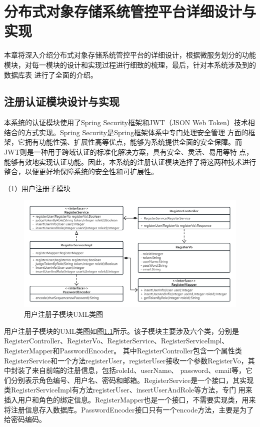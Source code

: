 \chapter{分布式对象存储系统管控平台详细设计与实现}

本章将深入介绍分布式对象存储系统管控平台的详细设计，根据微服务划分的功能模块，对每一模块的设计和实现过程进行细致的梳理，最后，针对本系统涉及到的数据库表
进行了全面的介绍。

\section{注册认证模块设计与实现}

本系统的认证模块使用了Spring Security框架和JWT（JSON Web Token）技术相结合的方式实现\cite{k256eji}。Spring Security是Spring框架体系中专门处理安全管理
方面的框架，它拥有功能性强、扩展性高等优点，能够为系统提供全面的安全保障。而JWT则是一种用于跨域认证的标准化解决方案，具有安全、灵活、易用等特
点，能够有效地实现认证功能。因此，本系统的注册认证模块选择了将这两种技术进行整合，以便更好地保障系统的安全性和可扩展性。

（1）用户注册子模块

\begin{figure}[htb]
    \centering
    \includegraphics[width=1\textwidth]{my_figures/chapter5/用户注册子模块UML类图.png}
    \caption{用户注册子模块UML类图}
    \label{fig:用户注册子模块UML类图}
\end{figure}

用户注册子模块的UML类图如图\ref{fig:用户注册子模块UML类图}所示。该子模块主要涉及六个类，分别是RegisterController、RegisterVo、RegisterService、RegisterServiceImpl、RegisterMapper和PasswordEncoder。
其中RegisterController包含一个属性类RegisterService和一个方法registerUser，registerUser接收一个参数RegisterVo，其中封装了来自前端的注册信息，包括roleId、userName、
password、email等，它们分别表示角色编号、用户名、密码和邮箱。RegisterService是一个接口，其实现类RegisterServiceImpl有方法registerUser、insertUserAndRole等方法，专门
用来插入用户和角色的绑定信息。RegisterMapper也是一个接口，不需要实现类，用来将注册信息存入数据库。PasswordEncoder接口只有一个encode方法，主要是为了给密码编码。



